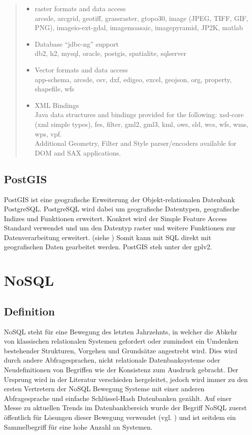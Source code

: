 \begin{quote}
\begin{itemize}
\item raster formats and data access\\
arcsde, arcgrid, geotiff, grassraster, gtopo30, image (JPEG, TIFF, GIF, PNG), imageio-ext-gdal, imagemoasaic, imagepyramid, JP2K, matlab
\item Database “jdbc-ng” support\\
db2, h2, mysql, oracle, postgis, spatialite, sqlserver
\item Vector formats and data access\\
app-schema, arcsde, csv, dxf, edigeo, excel, geojson, org, property, shapefile, wfs
\item XML Bindings\\
Java data structures and bindings provided for the following: xsd-core (xml simple types), fes, filter, gml2, gml3, kml, ows, sld, wcs, wfs, wms, wps, vpf.\\
Additional Geometry, Filter and Style parser/encoders available for DOM and SAX applications.
\end{itemize}
\end{quote}


\subsection{PostGIS}
PostGIS ist eine geografische Erweiterung der Objekt-relationalen Datenbank PostgreSQL.
PostgreSQL wird dabei um geografische Datentypen, geografische Indizes und Funktionen erweitert.
Konkret wird der Simple Feature Access Standard verwendet und um den Datentyp raster und weitere Funktionen zur Datenverarbeitung erweitert. (siehe \cite{website:postgisdocu-opengis})
Somit kann mit SQL direkt mit geografischen Daten gearbeitet werden.
PostGIS steh unter der \Gls{gpl}v2.



\section{NoSQL}
\label{nosql}
\subsection{Definition}

NoSQL steht für eine Bewegung des letzten Jahrzehnts, in welcher die Abkehr von klassischen relationalen Systemen gefordert oder zumindest ein Umdenken bestehender Strukturen, Vorgehen und Grundsätze angestrebt wird.
Dies wird durch andere Abfragesprachen, nicht relationale Datenbanksysteme oder Neudefinitionen von Begriffen wie der Konsistenz zum Ausdruck gebracht.
Der Ursprung wird in der Literatur verschieden hergeleitet, jedoch wird immer zu den ersten Vertretern der NoSQL Bewegung Systeme mit einer anderen Abfragesprache und einfache Schlüssel-Hash Datenbanken gezählt.
Auf einer Messe zu aktuellen Trends im Datenbankbereich wurde der Begriff NoSQL zuerst öffentlich für Lösungen dieser Bewegung verwendet (vgl. \cite{website:originnosql}) und ist seitdem ein Sammelbegriff für eine hohe Anzahl an Systemen.

